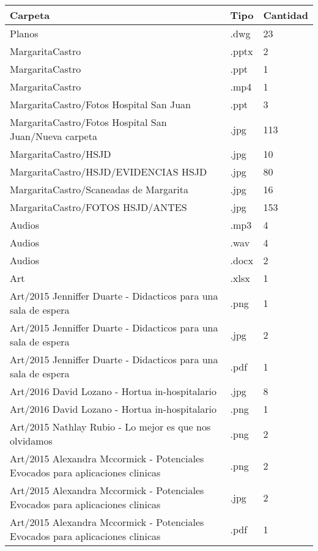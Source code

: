 \begin{table}[htbp]
    \centering
    \footnotesize
    \begin{tabular}{|l|l|l|}
    \hline
    Carpeta & Tipo & Cantidad \\
    \hline
    Planos & .dwg & 23 \\
    \hline
    MargaritaCastro & .pptx & 2 \\
    \hline
    MargaritaCastro & .ppt & 1 \\
    \hline
    MargaritaCastro & .mp4 & 1 \\
    \hline
    MargaritaCastro/Fotos Hospital San Juan & .ppt & 3 \\
    \hline
    MargaritaCastro/Fotos Hospital San Juan/Nueva carpeta & .jpg & 113 \\
    \hline
    MargaritaCastro/HSJD & .jpg & 10 \\
    \hline
    MargaritaCastro/HSJD/EVIDENCIAS HSJD & .jpg & 80 \\
    \hline
    MargaritaCastro/Scaneadas de Margarita & .jpg & 16 \\
    \hline
    MargaritaCastro/FOTOS HSJD/ANTES & .jpg & 153 \\
    \hline
    Audios & .mp3 & 4 \\
    \hline
    Audios & .wav & 4 \\
    \hline
    Audios & .docx & 2 \\
    \hline
    Art & .xlsx & 1 \\
    \hline
    Art/2015 Jenniffer Duarte - Didacticos para una sala de espera & .png & 1 \\
    \hline
    Art/2015 Jenniffer Duarte - Didacticos para una sala de espera & .jpg & 2 \\
    \hline
    Art/2015 Jenniffer Duarte - Didacticos para una sala de espera & .pdf & 1 \\
    \hline
    Art/2016 David Lozano - Hortua in-hospitalario & .jpg & 8 \\
    \hline
    Art/2016 David Lozano - Hortua in-hospitalario & .png & 1 \\
    \hline
    Art/2015 Nathlay Rubio - Lo mejor es que nos olvidamos & .png & 2 \\
    \hline
    Art/2015 Alexandra Mccormick - Potenciales Evocados para aplicaciones clinicas & .png & 2 \\
    \hline
    Art/2015 Alexandra Mccormick - Potenciales Evocados para aplicaciones clinicas & .jpg & 2 \\
    \hline
    Art/2015 Alexandra Mccormick - Potenciales Evocados para aplicaciones clinicas & .pdf & 1 \\

\end{tabular}
\end{table}
